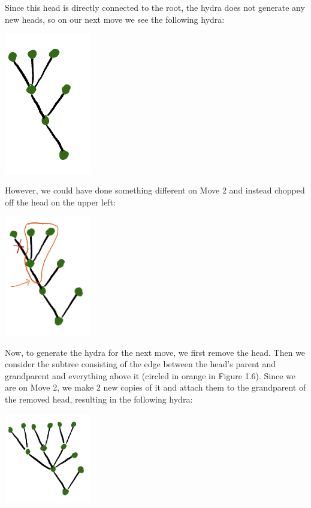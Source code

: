 \documentclass[a4paper]{memoir}
\theoremstyle{definition}
\begin{document}
Since this head is directly connected to the root, the hydra does not generate any new heads, 
so on our next move we see the following hydra:
\begin{center}
  \includegraphics[width=1.5in]{Hydra4}
\end{center}

However, we could have done something different on Move 2 and instead chopped off the head 
on the upper left:
\begin{center}
  \includegraphics[width=1.5in]{Hydra6}
\end{center}
Now, to generate the hydra for the next move, we first remove the head. Then we consider 
the subtree consisting of the edge between the head's parent and grandparent and 
everything above it (circled in orange in Figure 1.6). Since we are on Move 2, we make 2 new copies of 
it and attach them to the grandparent of the removed head, resulting in the following hydra:
\begin{center}
  \includegraphics[width=1.5in]{Hydra7}
\end{center}
\end{document}
